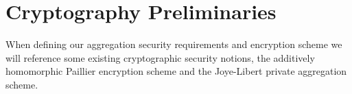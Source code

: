 \documentclass[10pt,letterpaper,oneside,twocolumn,journal]{IEEEtran}
\theoremstyle{definition}
\theoremstyle{definition}
\theoremstyle{remark}
\begin{document}
% 
%                                                                                                        
%                                                                                                        
%                                                                                                        
% 

\section{Cryptography Preliminaries} \label{sec:crypto_prelim}
When defining our aggregation security requirements and encryption scheme we will reference some existing cryptographic security notions, the additively homomorphic Paillier encryption scheme and the Joye-Libert private aggregation scheme.

% 
% 
\end{document}
